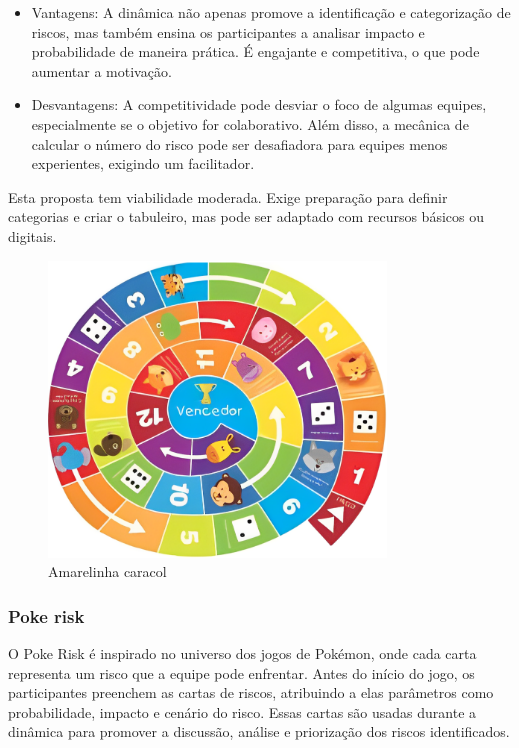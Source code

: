 \documentclass[
	12pt,
	openright,
	twoside,
	a4paper,
	english,
	brazil
	]{abntex2}
\begin{document}
\begin{itemize}
  \item Vantagens: A dinâmica não apenas promove a identificação e categorização de riscos, mas também ensina os participantes a analisar impacto e probabilidade de maneira prática. É engajante e competitiva, o que pode aumentar a motivação.  
  \item Desvantagens: A competitividade pode desviar o foco de algumas equipes, especialmente se o objetivo for colaborativo. Além disso, a mecânica de calcular o número do risco pode ser desafiadora para equipes menos experientes, exigindo um facilitador.
\end{itemize}

Esta proposta tem viabilidade moderada. Exige preparação para definir categorias e criar o tabuleiro, mas pode ser adaptado com recursos básicos ou digitais.

\begin{figure}[H]
  \centering
  \caption{\label{amarelinha}Amarelinha caracol}
  \includegraphics[width=0.8\textwidth]{amarelinha}
\end{figure}

\subsubsection{Poke risk}

O Poke Risk é inspirado no universo dos jogos de Pokémon, onde cada carta representa um risco que a equipe pode enfrentar. Antes do início do jogo, os participantes preenchem as cartas de riscos, atribuindo a elas parâmetros como probabilidade, impacto e cenário do risco. Essas cartas são usadas durante a dinâmica para promover a discussão, análise e priorização dos riscos identificados.
\end{document}
